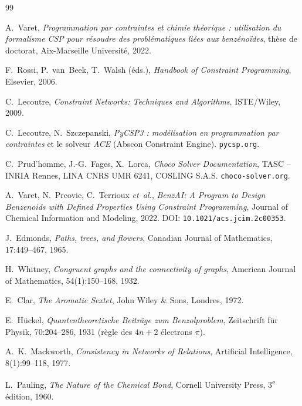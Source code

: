 \documentclass[11pt,a4paper]{article}
\begin{document}
\newpage
\renewcommand{\refname}{Références et bibliographie}
\begin{thebibliography}{99}
\small

 A.~Varet,
\emph{Programmation par contraintes et chimie théorique : utilisation du
formalisme CSP pour résoudre des problématiques liées aux benzénoïdes},
thèse de doctorat, Aix-Marseille Université, 2022.

 F.~Rossi, P.~van~Beek, T.~Walsh (éds.),
\emph{Handbook of Constraint Programming}, Elsevier, 2006.

 C.~Lecoutre,
\emph{Constraint Networks: Techniques and Algorithms}, ISTE/Wiley, 2009.

 C.~Lecoutre, N.~Szczepanski,
\emph{PyCSP3 : modélisation en programmation par contraintes} et le solveur
\emph{ACE} (Abscon Constraint Engine). \texttt{pycsp.org}.

 C.~Prud'homme, J.-G.~Fages, X.~Lorca,
\emph{Choco Solver Documentation}, TASC -- INRIA Rennes, LINA CNRS UMR 6241,
COSLING S.A.S. \texttt{choco-solver.org}.

 A.~Varet, N.~Prcovic, C.~Terrioux \emph{et~al.},
\emph{BenzAI: A Program to Design Benzenoids with Defined Properties
Using Constraint Programming}, Journal of Chemical Information and
Modeling, 2022. DOI: \texttt{10.1021/acs.jcim.2c00353}.

 J.~Edmonds,
\emph{Paths, trees, and flowers}, Canadian Journal of Mathematics, 17:449--467,
1965.

 H.~Whitney,
\emph{Congruent graphs and the connectivity of graphs}, American Journal of
Mathematics, 54(1):150--168, 1932.

 E.~Clar,
\emph{The Aromatic Sextet}, John Wiley \& Sons, Londres, 1972.

 E.~Hückel,
\emph{Quantentheoretische Beiträge zum Benzolproblem}, Zeitschrift für Physik,
70:204--286, 1931 (règle des $4n+2$ électrons $\pi$).

 A.~K.~Mackworth,
\emph{Consistency in Networks of Relations},
Artificial Intelligence, 8(1):99--118, 1977.

 L.~Pauling,
\emph{The Nature of the Chemical Bond}, Cornell University Press, 3\textsuperscript{e}
édition, 1960.


\end{thebibliography}
\end{document}
